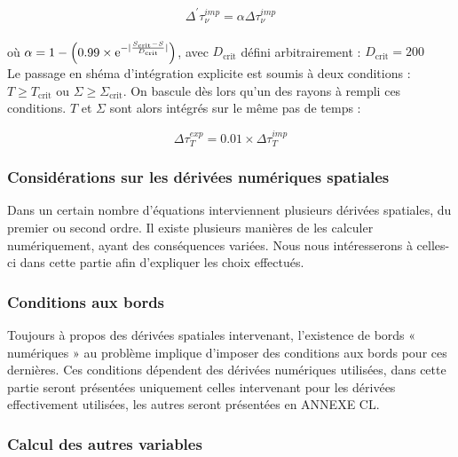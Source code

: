 \begin{equation}
	\Delta^{'} \tau_{\nu}^{imp} = \alpha \Delta \tau_{\nu}^{imp}
\end{equation} \\

où $\alpha = 1 - \left( 0.99 \times \e^{- \lvert \frac{S_\textrm{crit} - S}{D_\textrm{crit}} \rvert} \right)$, avec $D_\textrm{crit}$ défini arbitrairement : $D_\textrm{crit} = 200$ \\

Le passage en shéma d'intégration explicite est soumis à deux conditions : $T \ge T_\textrm{crit}$ ou $\Sigma \ge \Sigma_\textrm{crit}$. On bascule dès lors qu'un des rayons à rempli ces conditions. $T$ et $\Sigma$ sont alors intégrés sur le même pas de temps :

\begin{equation}
\Delta \tau_{T}^{exp} = 0.01 \times \Delta \tau_{T}^{imp}
\end{equation}

\subsubsection{Considérations sur les dérivées numériques spatiales}

Dans un certain nombre d’équations interviennent plusieurs dérivées spatiales,
du premier ou second ordre. Il existe plusieurs manières de les calculer
numériquement, ayant des conséquences variées. Nous nous intéresserons à
celles-ci dans cette partie afin d’expliquer les choix effectués.

\subsubsection{Conditions aux bords}

Toujours à propos des dérivées spatiales intervenant, l’existence de bords «
numériques » au problème implique d’imposer des conditions aux bords pour ces
dernières. Ces conditions dépendent des dérivées numériques utilisées, dans
cette partie seront présentées uniquement celles intervenant pour les dérivées
effectivement utilisées, les autres seront présentées en ANNEXE CL.

\subsubsection{Calcul des autres variables}


%

